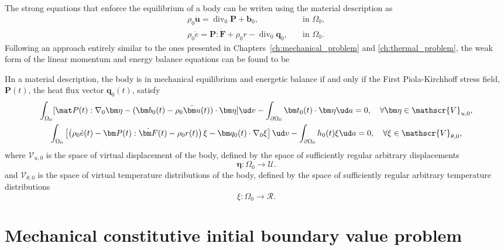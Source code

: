 The strong equations that enforce the equilibrium of a body can be writen using the material description as
\begin{align}
  \rho_0 \ddot{\bm u} = \operatorname{div}_0\bm P + \bm b_0, \quad & \text{in $\Omega_0$},\\
   \rho_0 \dot e = \bm P :\dot{\bm F} + \rho_0 r -\operatorname{div}_0 \bm q_0, \quad & \text{in  $\Omega_0$}.
\end{align}
Following an approach entirely similar to the ones presented in Chapters~\ref{ch:mechanical_problem} and \ref{ch:thermal_problem}, the weak form of the linear momentum and energy balance equations can be found to be
\begin{problem}
IIn a material description, the body is in mechanical equilibrium and energetic balance if and only if the First Piola-Kirchhoff stress field, \(\bm P(t)\), the heat flux vector \(\bm q_0(t)\), satisfy
    \begin{gather}
        \int_{\Omega_0} [\mat P(t):\nabla_0 \bm \eta - (\bm b_0(t) - \rho_0 \ddot{\bm u}(t))\cdot \bm \eta]\ud v - \int_{\partial\Omega_0} \bm t_0(t)\cdot \bm \eta\ud a = 0,\quad \forall \bm \eta \in \mathscr{V}_{u,0},\\
          \int_{\Omega_0}   \left[\left(\rho_0\dot e (t)- \bm P(t):\dot{\bm F}(t)- \rho_0r(t)\right) \xi - \bm q_0(t)\cdot \nabla_0 \xi\right]\ud v - \int_{\partial\Omega_0} h_0(t) \xi\ud a = 0,\quad \forall \xi \in \mathscr{V}_{\theta,0},
    \end{gather}
 where $\mathscr{V}_{u,0}$ is the space of virtual displacement of the body, defined by the space of sufficiently regular arbitrary displacements
 \begin{equation}
     \bm \eta\colon \Omega_0\to \mathscr{U}.
 \end{equation}
 and  $\mathscr{V}_{\theta,0}$ is the space of virtual temperature distributions of the body, defined by the space of sufficiently regular arbitrary temperature distributions
 \begin{equation}
     \xi\colon \Omega_0\to \mathscr R.
 \end{equation}
\end{problem}

\section{Mechanical constitutive initial boundary value problem}

